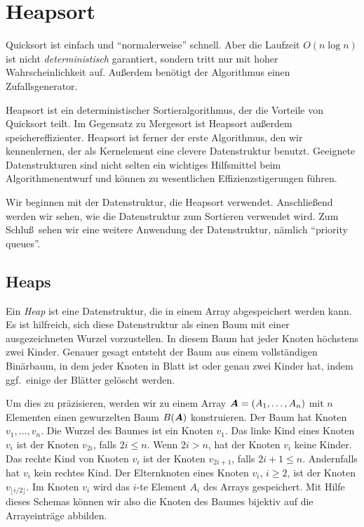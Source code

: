 \documentclass[10pt,reqno]{amsart}
\numberwithin{equation}{section}
\newcommand\vA{\vec A}
\def\vec#1{\mathchoice{\mbox{\boldmath$\displaystyle#1$}}
{\mbox{\boldmath$\textstyle#1$}}
{\mbox{\boldmath$\scriptstyle#1$}}
{\mbox{\boldmath$\scriptscriptstyle#1$}}}
\begin{document}
\section{Heapsort}\label{sec_heap}

Quicksort ist einfach und ``normalerweise'' schnell.
Aber die Laufzeit $O(n\log n)$ ist nicht {\em deterministisch} garantiert, sondern tritt nur mit hoher Wahrscheinlichkeit auf.
Au\ss erdem ben\"otigt der Algorithmus einen Zufallsgenerator.

Heapsort ist ein deterministischer Sortieralgorithmus, der die Vorteile von Quicksort teilt.
Im Gegensatz zu Mergesort ist Heapsort au\ss erdem speichereffizienter.
Heapsort ist ferner der erste Algorithmus, den wir kennenlernen, der als Kernelement eine clevere Datenstruktur benutzt.
Geeignete Datenstrukturen sind nicht selten ein wichtiges Hilfsmittel beim Algorithmenentwurf und k\"onnen zu wesentlichen Effizienzstigerungen f\"uhren.

Wir beginnen mit der Datenstruktur, die Heapsort verwendet.
Anschlie\ss end werden wir sehen, wie die Datenstruktur zum Sortieren verwendet wird.
Zum Schlu\ss\ sehen wir eine weitere Anwendung der Datenstruktur, n\"amlich ``priority queues''.

\subsection{Heaps}\label{sec_heaps}
Ein {\em Heap} ist eine Datenstruktur, die in einem Array abgespeichert werden kann.
Es ist hilfreich, sich diese Datenstruktur als einen Baum mit einer ausgezeichneten Wurzel vorzustellen.
In diesem Baum hat jeder Knoten h\"ochstens zwei Kinder.
Genauer gesagt entsteht der Baum aus einem vollst\"andigen Bin\"arbaum, in dem jeder Knoten in Blatt ist oder genau zwei Kinder hat, indem ggf.\ einige der Bl\"atter gel\"oscht werden.

Um dies zu pr\"azisieren, werden wir zu einem Array $\vA=(A_1,\ldots,A_n)$ mit $n$ Elementen einen gewurzelten Baum $B(\vA)$ konstruieren.
Der Baum hat Knoten $v_1,\ldots,v_n$.
Die Wurzel des Baumes ist ein Knoten $v_1$.
Das linke Kind eines Knoten $v_i$ ist der Knoten $v_{2i}$, falls $2i\leq n$.
Wenn $2i>n$, hat der Knoten $v_i$ keine Kinder.
Das rechte Kind von Knoten $v_i$ ist der Knoten $v_{2i+1}$, falls $2i+1\leq n$.
Andernfalls hat $v_i$ kein rechtes Kind.
Der Elternknoten eines Knoten $v_i$, $i\geq2$, ist der Knoten $v_{\lfloor i/2\rfloor}$.
Im Knoten $v_i$ wird das $i$-te Element $A_i$ des Arrays gespeichert.
Mit Hilfe dieses Schemas k\"onnen wir also die Knoten des Baumes bijektiv auf die Arrayeintr\"age abbilden.
\end{document}
